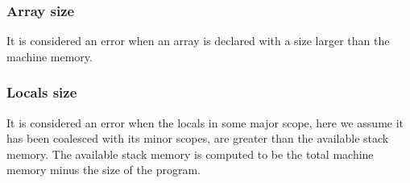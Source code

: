 \documentclass[oneside]{amsart}
\theoremstyle{definition}
\theoremstyle{remark}
\numberwithin{equation}{section}
\begin{document}
\subsubsection{Array size}
It is considered an error when an array is declared with a size larger than the machine memory.

\subsubsection{Locals size}
It is considered an error when the locals in some major scope, here we assume it has been coalesced
with its minor scopes, are greater than the available stack memory. The available stack memory is
computed to be the total machine memory minus the size of the program.


\end{document}

